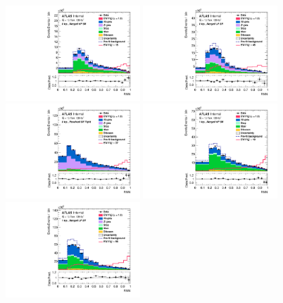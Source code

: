 \begin{figure}[H]
    \centering
    \includegraphics[width=0.45\textwidth]{figures/PostFit/Region_distRNN_DSRVBSHP_BMin0_J0_incJet1_L0_T0_incFat1_Y6051_incTag1_Fat1_GlobalFit_unconditionnal_mu1}
    \includegraphics[width=0.45\textwidth]{figures/PostFit/Region_distRNN_DSRVBSLP_BMin0_J0_incJet1_L0_T0_incFat1_Y6051_incTag1_Fat1_GlobalFit_unconditionnal_mu1}
    \includegraphics[width=0.45\textwidth]{figures/PostFit/Region_distRNN_DSRVBSFid_BMin0_T0_Y6051_incTag1_J2_L0_incJet1_GlobalFit_unconditionnal_mu1}
    \includegraphics[width=0.45\textwidth]{figures/PostFit/Region_distRNN_DSRVBSHP_BMin0_J0_incJet1_L1_T0_incFat1_Y6051_incTag1_Fat1_GlobalFit_unconditionnal_mu1}
    \\
    \includegraphics[width=0.45\textwidth]{figures/PostFit/Region_distRNN_DSRVBSLP_BMin0_J0_incJet1_L1_T0_incFat1_Y6051_incTag1_Fat1_GlobalFit_unconditionnal_mu1}

\end{figure}
